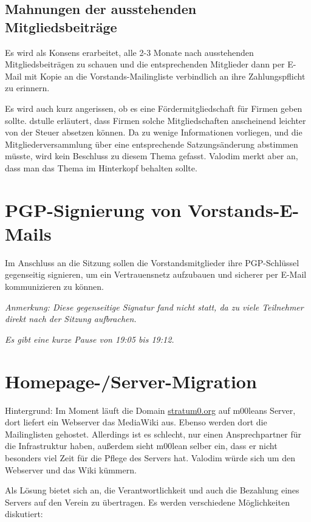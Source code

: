 \documentclass[a4paper,12pt]{scrartcl}
\begin{document}
\subsection{Mahnungen der ausstehenden Mitgliedsbeiträge}
Es wird als Konsens erarbeitet, alle 2-3 Monate nach ausstehenden
Mitgliedsbeiträgen zu schauen und die entsprechenden Mitglieder dann per E-Mail
mit Kopie an die Vorstands-Mailingliste verbindlich an ihre Zahlungspflicht zu
erinnern.

Es wird auch kurz angerissen, ob es eine Fördermitgliedschaft für Firmen geben
sollte. dstulle erläutert, dass Firmen solche Mitgliedschaften anscheinend
leichter von der Steuer absetzen können. Da zu wenige Informationen vorliegen,
und die Mitgliederversammlung über eine entsprechende Satzungsänderung abstimmen
müsste, wird kein Beschluss zu diesem Thema gefasst. Valodim merkt aber an, dass
man das Thema im Hinterkopf behalten sollte.

\section{PGP-Signierung von Vorstands-E-Mails}
Im Anschluss an die Sitzung sollen die Vorstandsmitglieder ihre PGP-Schlüssel
gegenseitig signieren, um ein Vertrauensnetz aufzubauen und sicherer per E-Mail
kommunizieren zu können.

\emph{Anmerkung: Diese gegenseitige Signatur fand nicht statt, da zu viele
Teilnehmer direkt nach der Sitzung aufbrachen.}

\emph{Es gibt eine kurze Pause von 19:05 bis 19:12.}

\section{Homepage-/Server-Migration}
Hintergrund: Im Moment läuft die Domain \url{stratum0.org} auf m00leans Server,
dort liefert ein Webserver das MediaWiki aus. Ebenso werden dort die
Mailinglisten gehostet. Allerdings ist es schlecht, nur einen Ansprechpartner
für die Infrastruktur haben, außerdem sieht m00lean selber ein, dass er nicht
besonders viel Zeit für die Pflege des Servers hat. Valodim würde sich um den
Webserver und das Wiki kümmern.

Als Lösung bietet sich an, die Verantwortlichkeit und auch die Bezahlung eines
Servers auf den Verein zu übertragen. Es werden verschiedene Möglichkeiten
diskutiert:
\end{document}
